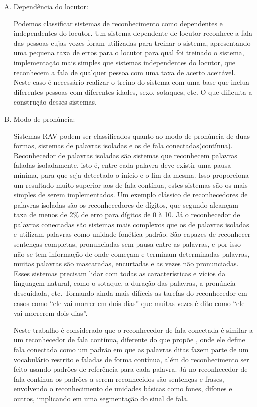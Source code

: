\begin{enumerate}[A)]
\item Dependência do locutor:

Podemos classificar sistemas de reconhecimento como dependentes e independentes do locutor. Um sistema dependente de locutor reconhece a fala das pessoas cujas vozes foram utilizadas para treinar o sistema, apresentando uma pequena taxa de erros para o locutor para qual foi treinado o sistema,  implementação mais simples que sistemas independentes do locutor, que reconhecem a fala de qualquer pessoa com uma taxa de acerto aceitável. Neste caso é necessário realizar o treino do sistema com uma base que inclua diferentes pessoas com diferentes idades, sexo, sotaques, etc. O que dificulta a construção desses sistemas.
\item Modo de pronúncia:

Sistemas RAV podem ser classificados quanto ao modo de pronúncia de duas formas, sistemas de palavras isoladas e os de fala conectadas(contínua). Reconhecedor de palavras isoladas são sistemas que reconhecem palavras faladas isoladamente, isto é, entre cada palavra deve existir uma pausa mínima, para que seja detectado o início e o fim da mesma. Isso proporciona um resultado muito superior aos de fala contínua, estes sistemas são os mais simples de serem implementados. Um exemplo clássico de reconhecedores de palavras isoladas são os reconhecedores de dígitos, que segundo  alcançam taxa de menos de 2{\%} de erro para dígitos de 0 à 10.
Já o reconhecedor de palavras conectadas são sistemas mais complexos que os de palavras isoladas e utilizam palavras como unidade fonética padrão. São capazes de reconhecer sentenças completas, pronunciadas sem pausa entre as palavras, e por isso não se tem informação de onde começam e terminam determinadas palavras, muitas palavras são mascaradas, encurtadas e as vezes não pronunciadas. Esses sistemas precisam lidar com todas as características e vícios da linguagem natural, como o sotaque, a duração das palavras, a pronúncia descuidada, etc. Tornando ainda mais difíceis as tarefas do reconhecedor em casos como “ele vai morrer em dois dias” que 
muitas vezes  é dito como “ele vai morrerem dois dias”. 

Neste trabalho é considerado que o reconhecedor de fala conectada é similar a um reconhecedor de fala contínua, diferente do que propõe , onde ele define fala conectada como um padrão em que as palavras ditas fazem parte de um vocabulário restrito e faladas de forma contínua, além do reconhecimento ser feito usando padrões de referência para cada palavra. Já no reconhecedor de fala contínua os padrões a serem reconhecidos são sentenças e frases, envolvendo o reconhecimento de unidades básicas como fones, difones e outros, implicando em uma segmentação do sinal de fala.


\end{enumerate}
